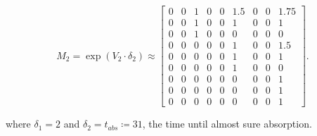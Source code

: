 \documentclass[hidelinks,11pt]{article}
\begin{document}
    \begin{equation*}
        M_2 = \exp(V_2 \cdot \delta_2) \approx
        \left [
            \begin{array}{ccc|ccc|ccc}
                0 & 0 & 1 & 0 & 0 & 1.5 & 0 & 0 & 1.75 \\
                0 & 0 & 1 & 0 & 0 & 1   & 0 & 0 & 1    \\
                0 & 0 & 1 & 0 & 0 & 0   & 0 & 0 & 0    \\
                \hline
                0 & 0 & 0 & 0 & 0 & 1   & 0 & 0 & 1.5  \\
                0 & 0 & 0 & 0 & 0 & 1   & 0 & 0 & 1    \\
                0 & 0 & 0 & 0 & 0 & 1   & 0 & 0 & 0    \\
                \hline
                0 & 0 & 0 & 0 & 0 & 0   & 0 & 0 & 1    \\
                0 & 0 & 0 & 0 & 0 & 0   & 0 & 0 & 1    \\
                0 & 0 & 0 & 0 & 0 & 0   & 0 & 0 & 1
            \end{array}
            \right ].
    \end{equation*}

    where $\delta_1 = 2$ and $\delta_2 = t_{abs} \coloneqq 31$, the time until almost sure absorption.
\end{document}
